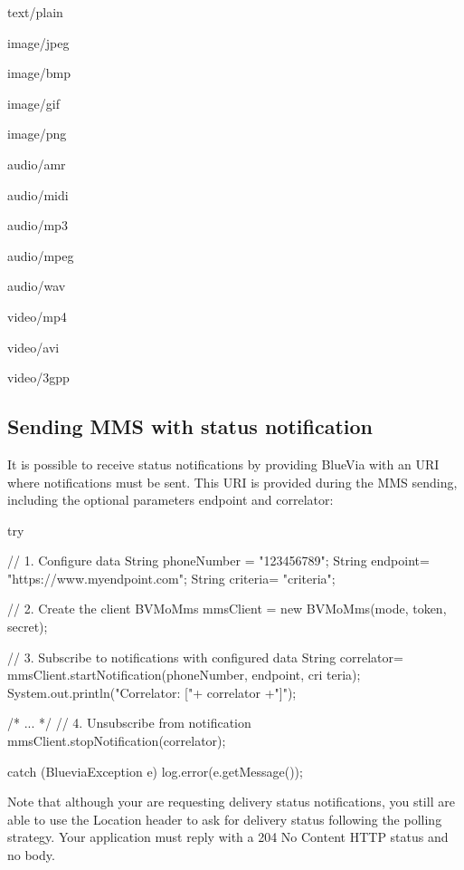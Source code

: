 \begin{DoxyItemize}
\item text/plain 
\item image/jpeg 
\item image/bmp 
\item image/gif 
\item image/png 
\item audio/amr 
\item audio/midi 
\item audio/mp3 
\item audio/mpeg 
\item audio/wav 
\item video/mp4 
\item video/avi 
\item video/3gpp 
\end{DoxyItemize}\hypertarget{blv_mms_mt_guide_mms_sending_notification}{}\subsection{Sending MMS with status notification}\label{blv_mms_mt_guide_mms_sending_notification}
It is possible to receive status notifications by providing BlueVia with an URI where notifications must be sent. This URI is provided during the MMS sending, including the optional parameters endpoint and correlator: 
\begin{DoxyCode}
try {
        // 1. Configure data
        String phoneNumber = "123456789";
        String endpoint= "https://www.myendpoint.com";
        String criteria= "criteria";

        // 2. Create the client
        BVMoMms mmsClient = new BVMoMms(mode, token, secret);
        
        // 3. Subscribe to notifications with configured data
        String correlator= mmsClient.startNotification(phoneNumber, endpoint, cri
      teria);
        System.out.println("Correlator: ["+ correlator +"]");

        /* ... */
        // 4. Unsubscribe from notification
        mmsClient.stopNotification(correlator);
                                          
} catch (BlueviaException e) {
        log.error(e.getMessage());
}
\end{DoxyCode}
 Note that although your are requesting delivery status notifications, you still are able to use the Location header to ask for delivery status following the polling strategy. Your application must reply with a 204 No Content HTTP status and no body.

